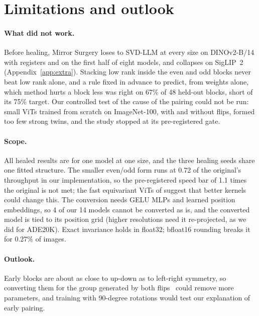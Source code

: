 \section{Limitations and outlook}
\label{sec:discussion}

\paragraph{What did not work.}
Before healing, Mirror Surgery loses to SVD-LLM at every size on DINOv2-B/14 with registers and on the first half of
eight models, and collapses on SigLIP~2 (Appendix~\ref{app:extra}). Stacking low rank inside the even and odd blocks
never beat low rank alone, and a rule fixed in advance to predict, from weights alone, which method hurts a block less
was right on 67\% of 48 held-out blocks, short of its 75\% target. Our controlled test of the cause of the pairing could
not be run: small ViTs trained from scratch on ImageNet-100, with and without flips, formed too few strong twins, and
the study stopped at its pre-registered gate.

\paragraph{Scope.}
All healed results are for one model at one size, and the three healing seeds share one fitted structure. The smaller
even/odd form runs at 0.72 of the original's throughput in our implementation, so the pre-registered speed bar of 1.1
times the original is not met; the fast equivariant ViTs of \citet{bokman2025flopping} suggest that better kernels could
change this. The conversion needs GELU MLPs and learned position embeddings, so 4 of our 14 models cannot be converted
as is, and the converted model is tied to its position grid (higher resolutions need it re-projected, as we did for
ADE20K). Exact invariance holds in float32; bfloat16 rounding breaks it for 0.27\% of images.

\paragraph{Outlook.}
Early blocks are about as close to up-down as to left-right symmetry, so converting them for the group generated by both
flips~\citep{nordstrom2025quick} could remove more parameters, and training with 90-degree rotations would test our
explanation of early pairing.
